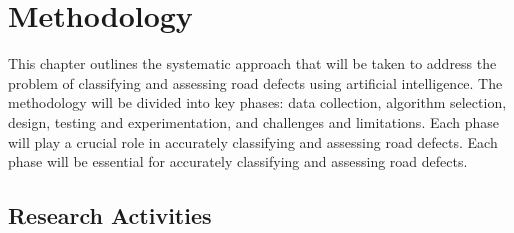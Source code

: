\chapter{Methodology}
This chapter outlines the systematic approach that will be taken to address the problem of classifying and assessing road defects using artificial intelligence. The methodology will be divided into key phases: data collection, algorithm selection, design, testing and experimentation, and challenges and limitations. Each phase will play a crucial role in accurately classifying and assessing road defects.  Each phase will be essential for accurately classifying and assessing road defects. 

\section{\textbf{ Research Activities} }

